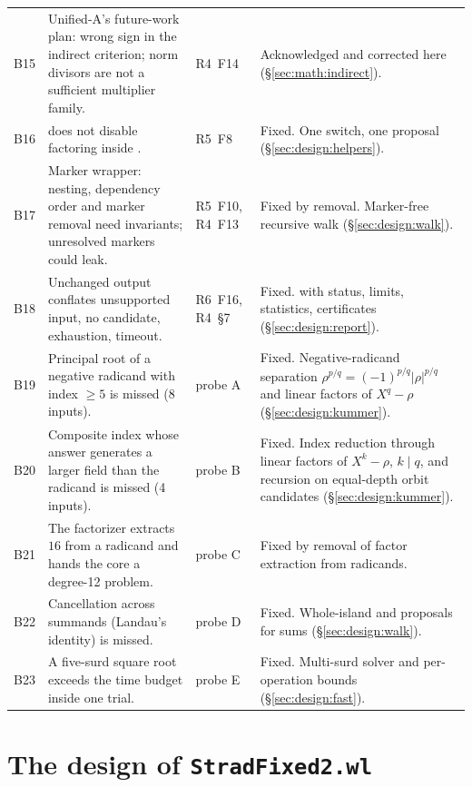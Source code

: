 \documentclass[11pt,oneside]{article}
\numberwithin{equation}{section}
\theoremstyle{definition}
\theoremstyle{remark}
\newcommand{\code}[1]{\texttt{\detokenize{#1}}}
\newcommand{\RIV}{\textsf{R4}}
\newcommand{\RV}{\textsf{R5}}
\newcommand{\RVI}{\textsf{R6}}
\begin{document}
\begin{small}
\begin{longtable}{@{}p{}>{\RaggedRight\arraybackslash}p{}>{\RaggedRight\arraybackslash}p{}>{\RaggedRight\arraybackslash}p{}@{}}
\label{b:15}B15 & Unified-A's future-work plan: wrong sign in the indirect criterion; norm divisors are not a sufficient multiplier family. & \RIV\ F14 & Acknowledged and corrected here (\S\ref{sec:math:indirect}).\\
\label{b:16}B16 & \code{"Factor" -> False} does not disable factoring inside \code{normalizeRadicand}. & \RV\ F8 & Fixed. One switch, one \code{Factor} proposal (\S\ref{sec:design:helpers}).\\
\label{b:17}B17 & Marker wrapper: nesting, dependency order and marker removal need invariants; unresolved markers could leak. & \RV\ F10, \RIV\ F13 & Fixed by removal. Marker-free recursive walk (\S\ref{sec:design:walk}).\\
\label{b:18}B18 & Unchanged output conflates unsupported input, no candidate, exhaustion, timeout. & \RVI\ F16, \RIV\ \S7 & Fixed. \code{DenestReport} with status, limits, statistics, certificates (\S\ref{sec:design:report}).\\
\label{b:19}B19 & Principal root of a negative radicand with index $\ge5$ is missed (8 inputs). & probe A & Fixed. Negative-radicand separation $\rho^{p/q}=(-1)^{p/q}|\rho|^{p/q}$ and linear factors of $X^q-\rho$ (\S\ref{sec:design:kummer}).\\
\label{b:20}B20 & Composite index whose answer generates a larger field than the radicand is missed (4 inputs). & probe B & Fixed. Index reduction through linear factors of $X^k-\rho$, $k\mid q$, and recursion on equal-depth orbit candidates (\S\ref{sec:design:kummer}).\\
\label{b:21}B21 & The factorizer extracts $16$ from a radicand and hands the core a degree-12 problem. & probe C & Fixed by removal of factor extraction from radicands.\\
\label{b:22}B22 & Cancellation across summands (Landau's identity) is missed. & probe D & Fixed. Whole-island \code{RootReduce} and \code{Simplify} proposals for sums (\S\ref{sec:design:walk}).\\
\label{b:23}B23 & A five-surd square root exceeds the time budget inside one trial. & probe E & Fixed. Multi-surd solver and per-operation bounds (\S\ref{sec:design:fast}).\\
\end{longtable}
\end{small}

\section{The design of \texttt{StradFixed2.wl}}\label{sec:design}
\end{document}
